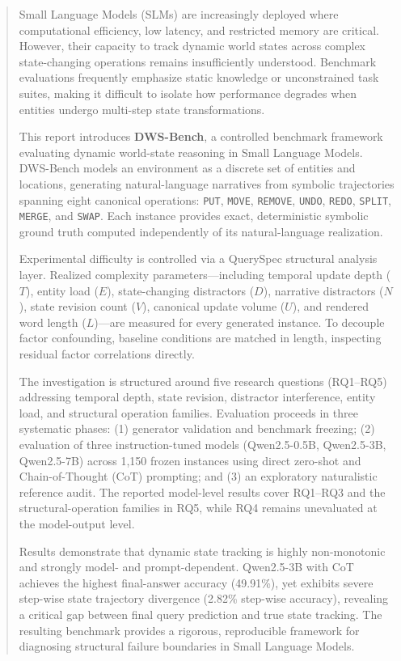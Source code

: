 \documentclass{iutbscthesis}
\begin{document}
\begin{abstract}
Small Language Models (SLMs) are increasingly deployed where computational efficiency, low latency, and restricted memory are critical. However, their capacity to track dynamic world states across complex state-changing operations remains insufficiently understood. Benchmark evaluations frequently emphasize static knowledge or unconstrained task suites, making it difficult to isolate how performance degrades when entities undergo multi-step state transformations.

This report introduces \textbf{DWS-Bench}, a controlled benchmark framework evaluating dynamic world-state reasoning in Small Language Models. DWS-Bench models an environment as a discrete set of entities and locations, generating natural-language narratives from symbolic trajectories spanning eight canonical operations: \texttt{PUT}, \texttt{MOVE}, \texttt{REMOVE}, \texttt{UNDO}, \texttt{REDO}, \texttt{SPLIT}, \texttt{MERGE}, and \texttt{SWAP}. Each instance provides exact, deterministic symbolic ground truth computed independently of its natural-language realization.

Experimental difficulty is controlled via a QuerySpec structural analysis layer. Realized complexity parameters—including temporal update depth ($T$), entity load ($E$), state-changing distractors ($D$), narrative distractors ($N$), state revision count ($V$), canonical update volume ($U$), and rendered word length ($L$)—are measured for every generated instance. To decouple factor confounding, baseline conditions are matched in length, inspecting residual factor correlations directly.

The investigation is structured around five research questions (RQ1--RQ5) addressing temporal depth, state revision, distractor interference, entity load, and structural operation families. Evaluation proceeds in three systematic phases: (1) generator validation and benchmark freezing; (2) evaluation of three instruction-tuned models (\mbox{Qwen2.5-0.5B}, \mbox{Qwen2.5-3B}, \mbox{Qwen2.5-7B}) across 1,150 frozen instances using direct zero-shot and Chain-of-Thought (CoT) prompting; and (3) an exploratory naturalistic reference audit. The reported model-level results cover RQ1--RQ3 and the structural-operation families in RQ5, while RQ4 remains unevaluated at the model-output level.

Results demonstrate that dynamic state tracking is highly non-monotonic and strongly model- and prompt-dependent. \mbox{Qwen2.5-3B} with CoT achieves the highest final-answer accuracy (49.91\%), yet exhibits severe step-wise state trajectory divergence (2.82\% step-wise accuracy), revealing a critical gap between final query prediction and true state tracking. The resulting benchmark provides a rigorous, reproducible framework for diagnosing structural failure boundaries in Small Language Models.
\end{abstract}
\end{document}
